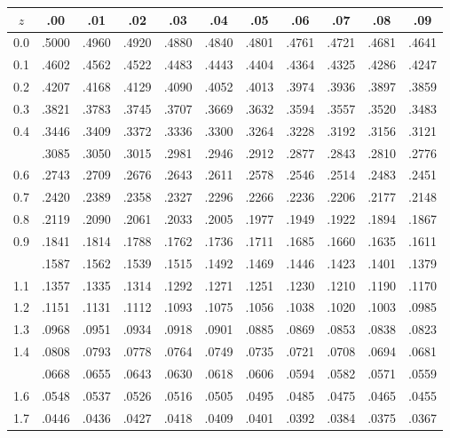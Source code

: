 \begin{tabular}{c|*{10}{c}}
  \toprule
  $z$ & .00 & .01 & .02 & .03 & .04 & .05 & .06 & .07 & .08 & .09 \\
  \midrule
  0.0 & .5000 & .4960 & .4920 & .4880 & .4840 & .4801 & .4761 & .4721 & .4681 & .4641 \\
  0.1 & .4602 & .4562 & .4522 & .4483 & .4443 & .4404 & .4364 & .4325 & .4286 & .4247 \\
  0.2 & .4207 & .4168 & .4129 & .4090 & .4052 & .4013 & .3974 & .3936 & .3897 & .3859 \\
  0.3 & .3821 & .3783 & .3745 & .3707 & .3669 & .3632 & .3594 & .3557 & .3520 & .3483 \\
  0.4 & .3446 & .3409 & .3372 & .3336 & .3300 & .3264 & .3228 & .3192 & .3156 & .3121 \\
  \addlinespace[2pt]
  0.5 & .3085 & .3050 & .3015 & .2981 & .2946 & .2912 & .2877 & .2843 & .2810 & .2776 \\
  0.6 & .2743 & .2709 & .2676 & .2643 & .2611 & .2578 & .2546 & .2514 & .2483 & .2451 \\
  0.7 & .2420 & .2389 & .2358 & .2327 & .2296 & .2266 & .2236 & .2206 & .2177 & .2148 \\
  0.8 & .2119 & .2090 & .2061 & .2033 & .2005 & .1977 & .1949 & .1922 & .1894 & .1867 \\
  0.9 & .1841 & .1814 & .1788 & .1762 & .1736 & .1711 & .1685 & .1660 & .1635 & .1611 \\
  \addlinespace[2pt]
  1.0 & .1587 & .1562 & .1539 & .1515 & .1492 & .1469 & .1446 & .1423 & .1401 & .1379 \\
  1.1 & .1357 & .1335 & .1314 & .1292 & .1271 & .1251 & .1230 & .1210 & .1190 & .1170 \\
  1.2 & .1151 & .1131 & .1112 & .1093 & .1075 & .1056 & .1038 & .1020 & .1003 & .0985 \\
  1.3 & .0968 & .0951 & .0934 & .0918 & .0901 & .0885 & .0869 & .0853 & .0838 & .0823 \\
  1.4 & .0808 & .0793 & .0778 & .0764 & .0749 & .0735 & .0721 & .0708 & .0694 & .0681 \\
  \addlinespace[2pt]
  1.5 & .0668 & .0655 & .0643 & .0630 & .0618 & .0606 & .0594 & .0582 & .0571 & .0559 \\
  1.6 & .0548 & .0537 & .0526 & .0516 & .0505 & .0495 & .0485 & .0475 & .0465 & .0455 \\
  1.7 & .0446 & .0436 & .0427 & .0418 & .0409 & .0401 & .0392 & .0384 & .0375 & .0367 \\

\end{tabular}
